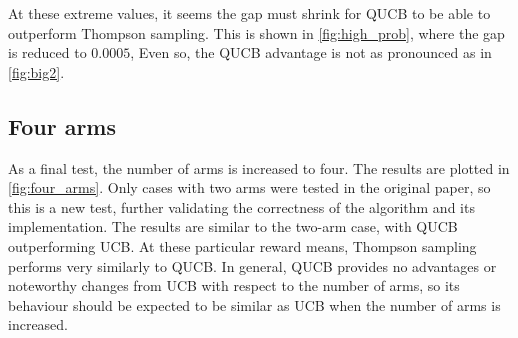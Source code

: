 At these extreme values, it seems the gap must shrink for QUCB to be able to outperform Thompson sampling.
This is shown in \cref{fig:high_prob}, where the gap is reduced to $0.0005$,
Even so, the QUCB advantage is not as pronounced as in \cref{fig:big2}.



\subsection{Four arms}
As a final test, the number of arms is increased to four.
The results are plotted in \cref{fig:four_arms}.
Only cases with two arms were tested in the original paper, so this is a new test, further validating the correctness of the algorithm and its implementation.
The results are similar to the two-arm case, with QUCB outperforming UCB.
At these particular reward means, Thompson sampling performs very similarly to QUCB.
In general, QUCB provides no advantages or noteworthy changes from UCB with respect to the number of arms, so its behaviour should be expected to be similar as UCB when the number of arms is increased.

